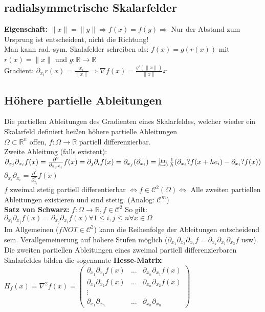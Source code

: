 \documentclass[german]{latex4ei/latex4ei_sheet}
\begin{document}
\begin{sectionbox}		
	\subsection*{radialsymmetrische Skalarfelder}
	\textbf{Eigenschaft:} $\|x\| = \|y\| \Rightarrow f(x) = f(y) \Rightarrow$ Nur der Abstand zum Ursprung ist entscheident, nicht die Richtung!\\
	Man kann rad.-sym. Skalafelder schreiben als: $f(x)=g(r(x))$ mit $r(x)=\|x\|$ und $g: \mathbb{R} \rightarrow \mathbb{R}$\\
	Gradient: $\partial_{x_i} r(x)=\frac{x_i}{\|x\|} \Rightarrow \nabla f(x)=\frac{g'(\|x\|)}{\|x\|}x$ \\
\end{sectionbox}	
	
	\subsection{Höhere partielle Ableitungen}
	Die partiellen Ableitungen des Gradienten eines Skalarfeldes, welcher wieder ein Skalarfeld definiert heißen h\"ohere partielle Ableitungen\\
	$\Omega \subset \mathbb{R}^n$ offen, $f: \Omega \rightarrow \mathbb{R}$ partiell differenzierbar.\\
	Zweite Ableitung (falls existent): $\partial_{x_j} \partial_{x_i} f(x)=\frac{\partial^2}{\partial_{x_j x_i} } f(x) = \partial_j \partial_i f(x) = \partial_{x_j} (\partial_{x_i})= \Lim{h \to 0} \frac{1}{h} (\partial_{x_i}? f (x + h e_i)- \partial_{x_i}? f(x)) $\\
	$\partial_{x_i} \partial_{x_i} = \frac{\partial^2}{\partial_{x_i}^2} f(x)$\\
	$f$ zweimal stetig partiell differentierbar $\Leftrightarrow f \in \mathcal{C}^2(\Omega) \Leftrightarrow $ Alle zweiten partiellen Ableitungen existieren und sind stetig. (Analog: $\mathcal{C}^m$)\\
	\textbf{Satz von Schwarz:} $f: \Omega \rightarrow \mathbb{R}, f \in \mathcal{C}^2$ So gilt: $\partial_{x_i} \partial_{x_j} f(x) = \partial_{x_j} \partial_{x_i} f(x) \forall 1\le i,j \le n \forall x \in \Omega$\\
	Im Allgemeinen ($f NOT \in \mathcal{C}^2$) kann die Reihenfolge der Ableitungen entscheidend sein. Verallgemeinerung auf h\"ohere Stufen m\"oglich ($\partial_{x_1} \partial_{x_3} \partial_{x_7} f = \partial_{x_7} \partial_{x_1} \partial_{x_3} f$ usw).\\
	Die zweiten partiellen Ableitungen eines zweimal partiell differenzierbaren Skalarfeldes bilden die sogenannte \textbf{Hesse-Matrix}\\ $H_f (x) = \nabla^2 f(x) = \begin{pmatrix}
		\partial_{x_1} \partial_{x_1} f(x) & ... & \partial_{x_n} \partial_{x_1} f(x) \\ \partial_{x_1} \partial_{x_2} f(x) & ... & \partial_{x_n} \partial_{x_2} f(x) \\ \vdots \  \  \\ \partial_{x_1} \partial_{x_n} & ... & \partial_{x_n} \partial_{x_n} 	
	\end{pmatrix}$ 
\end{document}
